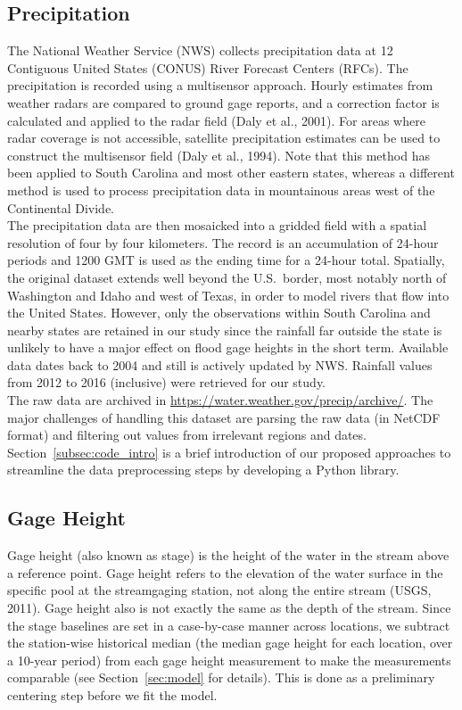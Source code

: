 \documentclass{svjour3}
\begin{document}
\subsection{Precipitation}\label{subsec:precipitation}
The National Weather Service (NWS) collects precipitation data at 12 Contiguous United States (CONUS) River Forecast Centers (RFCs).
The precipitation is recorded using a multisensor approach.
Hourly estimates from weather radars are compared to ground gage reports, and a correction factor is calculated and applied to the radar field (Daly et al., 2001).
For areas where radar coverage is not accessible, satellite precipitation estimates can be used to construct the multisensor field (Daly et al., 1994).
Note that this method has been applied to South Carolina and most other eastern states, whereas a different method is used to process  precipitation data in mountainous areas west of the Continental Divide.\\

The precipitation data are then mosaicked into a gridded field with a spatial resolution of four by four kilometers.
The record is an accumulation of 24-hour periods and 1200 GMT is used as the ending time for a 24-hour total.
Spatially, the original dataset extends well beyond the U.S.\ border, most notably north of Washington and Idaho and west of Texas, in order to model rivers that flow into the United States.
However, only the observations within South Carolina and nearby states are retained in our study since the rainfall far outside the state is unlikely to have a major effect on flood gage heights in the short term.
Available data dates back to 2004 and still is actively updated by NWS. Rainfall values from 2012 to 2016 (inclusive) were retrieved for our study.  \\

The raw data are archived in \url{https://water.weather.gov/precip/archive/}.
The major challenges of handling this dataset are parsing the raw data (in NetCDF format) and filtering out values from  irrelevant regions and dates.
 Section~\ref{subsec:code_intro} is a brief introduction of our proposed approaches to streamline the data preprocessing steps by developing a Python library.


\subsection{Gage Height}\label{subsec:gage-height}
Gage height (also known as stage) is the height of the water in the stream above a reference point.
Gage height refers to the elevation of the water surface in the specific pool at the streamgaging station, not along the entire stream (USGS, 2011).
Gage height also is not exactly the same as the depth of the stream.
Since the stage baselines are set in a case-by-case manner across locations, we subtract the station-wise historical median (the median gage height for each location, over a 10-year period) from each gage height measurement to make the measurements comparable (see Section~\ref{sec:model}  for details).
This is done as a preliminary centering step before we fit the model.\\
\end{document}
